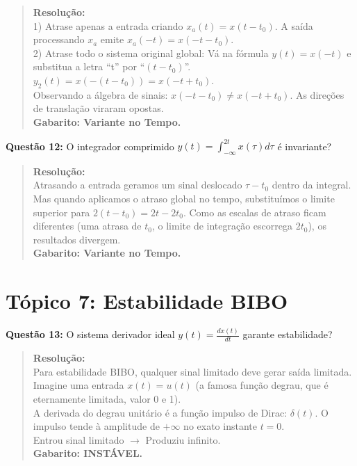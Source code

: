 \begin{quote}
\textbf{Resolução:}\\
1) Atrase apenas a entrada criando \(x_a(t) = x(t-t_0)\). A saída processando \(x_a\) emite \(x_a(-t) = x(-t - t_0)\).\\
2) Atrase todo o sistema original global: Vá na fórmula \(y(t) = x(-t)\) e substitua a letra ``t'' por ``\((t-t_0)\)''.\\
\(y_2(t) = x(-(t-t_0)) = x(-t + t_0)\).\\
Observando a álgebra de sinais: \(x(-t - t_0) \neq x(-t + t_0)\). As direções de translação viraram opostas.\\
\textbf{Gabarito: Variante no Tempo.}
\end{quote}

\textbf{Questão 12:} O integrador comprimido \(y(t) = \int_{-\infty}^{2t} x(\tau) d\tau\) é invariante?

\begin{quote}
\textbf{Resolução:}\\
Atrasando a entrada geramos um sinal deslocado \(\tau-t_0\) dentro da integral. Mas quando aplicamos o atraso global no tempo, substituímos o limite superior para \(2(t-t_0) = 2t - 2t_0\). Como as escalas de atraso ficam diferentes (uma atrasa de \(t_0\), o limite de integração escorrega \(2t_0\)), os resultados divergem.\\
\textbf{Gabarito: Variante no Tempo.}
\end{quote}

\section{Tópico 7: Estabilidade BIBO}\label{tuxf3pico-7-estabilidade-bibo}

\textbf{Questão 13:} O sistema derivador ideal \(y(t) = \frac{dx(t)}{dt}\) garante estabilidade?

\begin{quote}
\textbf{Resolução:}\\
Para estabilidade BIBO, qualquer sinal limitado deve gerar saída limitada.\\
Imagine uma entrada \(x(t) = u(t)\) (a famosa função degrau, que é eternamente limitada, valor 0 e 1).\\
A derivada do degrau unitário é a função impulso de Dirac: \(\delta(t)\). O impulso tende à amplitude de \(+\infty\) no exato instante \(t=0\).\\
Entrou sinal limitado \(\to\) Produziu infinito.\\
\textbf{Gabarito: INSTÁVEL.}
\end{quote}

